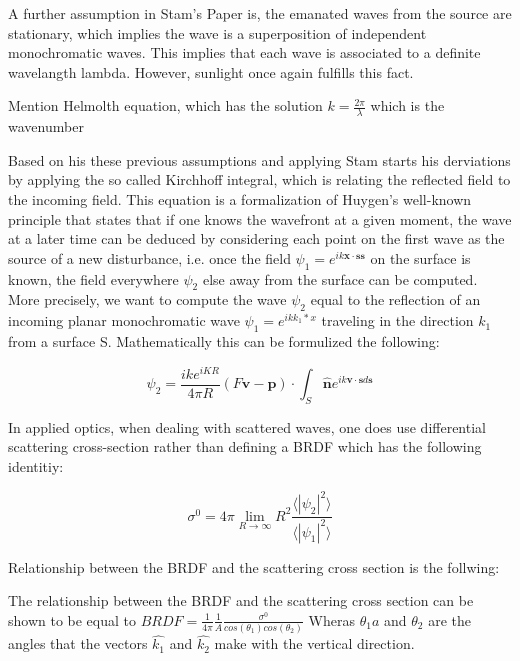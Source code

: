 A further assumption in Stam's Paper is, the emanated waves from the source are stationary, which implies the wave is a superposition of independent monochromatic waves. This implies that each wave is associated to a definite wavelangth lambda. However, sunlight once again fulfills this fact.

Mention Helmolth equation, which has the solution $k = \frac{2\pi}{\lambda}$ which is the wavenumber


Based on his these previous assumptions and applying Stam starts his derviations by applying the so called Kirchhoff integral, which is relating the reflected field to the incoming field. This equation is a formalization of Huygen’s well-known principle that states that if one knows the wavefront at a given moment, the wave at a later time can be deduced by considering each point on the first wave as the source of a new disturbance, i.e. once the field  $\psi_1 =  e^{ik\mathbf{x} \cdot \mathbf{s}\mathbf{s}}$ on the surface is known, the field everywhere $\psi_2$ else away from the surface can be computed.
More precisely, we want to compute the wave $\psi_2$ equal to the reflection of an incoming planar monochromatic wave $\psi_1 = e^{ik k_1 * x}$  traveling in the direction $k_1$ from a surface S. Mathematically this can be formulized the following:

\begin{equation}
  \psi_2 = \frac{i k e^{i K R}}{4 \pi R}(F\mathbf{v}-\mathbf{p}) \cdot \int_{S} \hat{\mathbf{n}} e^{ik\mathbf{v} \cdot \mathbf{s} d\mathbf{s}}
\end{equation}


In applied optics, when dealing with scattered waves, one does use differential scattering cross-section rather than defining a BRDF which has the following identitiy: 

\begin{equation}
    \sigma^0 = 4 \pi \lim_{R \to \infty} R^2 \frac{\langle \left|\psi_2\right|^2\rangle}{\langle \left|\psi_1\right|^2\rangle}
\end{equation}

Relationship between the BRDF and the scattering cross section is the follwing:

The relationship between the BRDF and the scattering cross section can be shown to be equal to $BRDF = \frac{1}{4\pi}\frac{1}{A}\frac{\sigma^0}{cos(\theta_1)cos(\theta_2)}$
Wheras $\theta_1a$ and $\theta_2$ are the angles that the vectors $\hat{k_1}$
and $\hat{k_2}$ make with the vertical direction.
 

